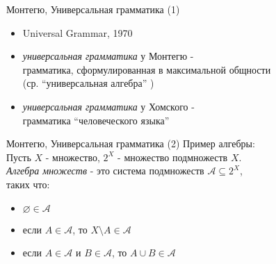 \documentclass{beamer}
\begin{document}




\begin{frame}{Монтегю, Универсальная грамматика (1)}
\begin{itemize}
  \item Universal Grammar, 1970
  \item \textit{универсальная грамматика} у Монтегю - \\
  грамматика, сформулированная в максимальной общности\\
  (ср. ``универсальная алгебра'' )
  \item \textit{универсальная грамматика} у Хомского - \\
  грамматика ``человеческого языка''
\end{itemize}
\end{frame}

\begin{frame}{Монтегю, Универсальная грамматика (2)}
Пример алгебры:\\
\bigskip
Пусть $X$ - множество, $2^X$ - множество подмножеств $X$.\\
\textit{Алгебра множеств} - это система подмножеств $\mathcal{A} \subseteq 2^X$,\\ таких что:\\
\begin{itemize}
  \item $\varnothing \in \mathcal{A}$
  \item если $A \in \mathcal{A}$, то $X \! \setminus \! A \in \mathcal{A}$
  \item если $A \in \mathcal{A}$ и $B \in \mathcal{A}$, то $A \cup B \in \mathcal{A}$
\end{itemize}
\end{frame}
\end{document}
